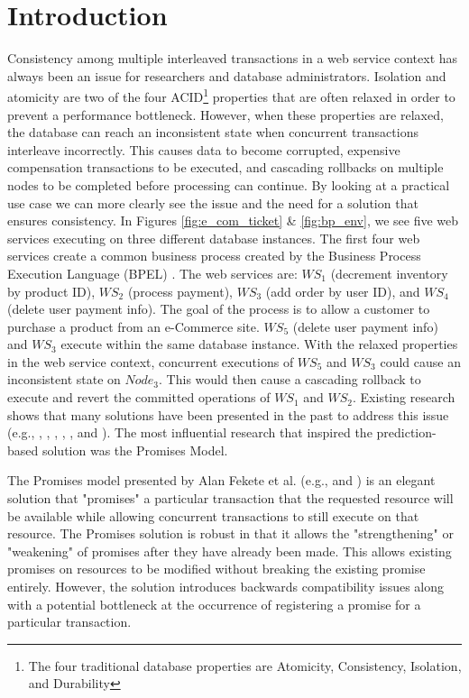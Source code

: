 \section{Introduction}
\label{pbs:introduction}
Consistency among multiple interleaved transactions in a web service context has always been an issue for researchers and database administrators. Isolation and atomicity are two of the four \ac{ACID}\footnote{The four traditional database properties are Atomicity, Consistency, Isolation, and Durability} properties that are often relaxed in order to prevent a performance bottleneck. However, when these properties are relaxed, the database can reach an inconsistent state when concurrent transactions interleave incorrectly. This causes data to become corrupted, expensive compensation transactions to be executed, and cascading rollbacks on multiple nodes to be completed before processing can continue. By looking at a practical use case we can more clearly see the issue and the need for a solution that ensures consistency. In Figures \ref{fig:e_com_ticket} \& \ref{fig:bp_env}, we see five web services executing on three different database instances. The first four web services  create a common business process created by the Business Process Execution Language (\ac{BPEL}) \cite{BPEL}. The web services are: $WS_{1}$ (decrement inventory by product ID), $WS_{2}$ (process payment), $WS_{3}$ (add order by user ID), and $WS_{4}$ (delete user payment info). The goal of the process is to allow a customer to purchase a product from an e-Commerce site. $WS_{5}$ (delete user payment info) and $WS_{3}$ execute within the same database instance. With the relaxed properties in the web service context, concurrent executions of $WS_{5}$ and $WS_{3}$ could cause an inconsistent state on $Node_{3}$. This would then cause a cascading rollback to execute and revert the committed operations of $WS_{1}$ and $WS_{2}$. Existing research shows that many solutions have been presented in the past to address this issue (e.g., \cite{Fekete_SnapshotIso}, \cite{Alrifai_Distributed_Managment}, \cite{Fekete_RAMP}, \cite{Fekete_IsolationSupport}, \cite{Jacobi_Locking}, and \cite{Fekete_Promises}). The most influential research that inspired the prediction-based solution was the Promises Model.

The Promises model presented by Alan Fekete et al. (e.g., \cite{Fekete_IsolationSupport} and \cite{Fekete_Promises}) is an elegant solution that "promises" a particular transaction that the requested resource will be available while allowing concurrent transactions to still execute on that resource. The Promises solution is robust in that it allows the "strengthening" or "weakening" of promises after they have already been made. This allows existing promises on resources to be modified without breaking the existing promise entirely. However, the solution introduces backwards compatibility issues along with a potential bottleneck at the occurrence of registering a promise for a particular transaction. 

